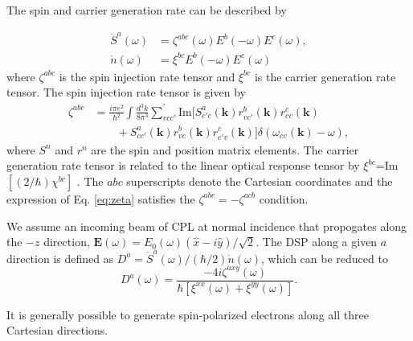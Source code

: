 \documentclass[pss]{wiley2sp} %
\begin{document}
The spin and carrier generation rate can be described by 

\begin{align*}
\dot{S}^{a}(\omega) &= \zeta^{abc}(\omega)E^{b}(-\omega)E^{c}(\omega), \nonumber \\ 
\dot{n}(\omega)     &= \xi^{bc}E^{b}(-\omega)E^{c}(\omega)
\end{align*}
where $\zeta^{abc}$ is the spin injection rate tensor and $\xi^{bc}$ is the carrier generation rate tensor. The spin injection rate tensor is given by
\begin{align}\label{eq:zeta}
\zeta^{abc} &= \frac{i\pi e^{2}}{\hbar^{2}}\int\frac{d^{3}k}{8\pi^{3}}
\sum_{vcc'}^{\prime}\text{Im}\bigl[S^{a}_{c'c}(\textbf{k})
r^{b}_{vc'}(\textbf{k})r^{c}_{cv}(\textbf{k})\nonumber\\
&\qquad+S^{a}_{cc'}(\textbf{k})
r^{b}_{vc}(\textbf{k})r^{c}_{c'v}(\textbf{k})\bigr]
\delta(\omega_{cv}(\textbf{k})-\omega),
\end{align}
where $S^{n}$ and $r^{n}$ are the spin and position matrix elements. The carrier generation rate tensor is related to the linear optical response tensor by $\xi^{bc}$=Im$[(2/\hbar)\chi^{bc}]$ . The $abc$ superscripts denote the Cartesian coordinates and the expression of Eq. \eqref{eq:zeta} satisfies the $\zeta^{abc} = -\zeta^{acb}$ condition.

We assume an incoming beam of CPL at normal incidence that propogates along the $-z$ direction, $\mathbf{E}(\omega) = E_{0}(\omega)(\hat{x} - i\hat{y})/\sqrt{2}$. The DSP along a given $a$ direction is defined as $D^{a}=\dot{S}^{a}(\omega)/(\hbar/2)\dot{n}(\omega)$, which can be reduced to 
\begin{equation}\label{eq:D^i}
D^{a}(\omega) = 
\frac{-4i\zeta^{axy}(\omega)}
    {\hbar\left[\xi^{xx}(\omega) + \xi^{yy}(\omega)\right]}.
\end{equation}

It is generally possible to generate spin-polarized electrons along all three
Cartesian directions. 

\end{document}
